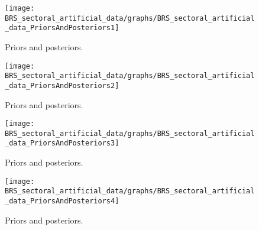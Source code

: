  
\begin{figure}[H]
\centering
\texttt{[image: BRS\_sectoral\_artificial\_data/graphs/BRS\_sectoral\_artificial\_data\_PriorsAndPosteriors1]}
\caption{Priors and posteriors.}\label{Fig:PriorsAndPosteriors:1}
\end{figure}
 
\begin{figure}[H]
\centering
\texttt{[image: BRS\_sectoral\_artificial\_data/graphs/BRS\_sectoral\_artificial\_data\_PriorsAndPosteriors2]}
\caption{Priors and posteriors.}\label{Fig:PriorsAndPosteriors:2}
\end{figure}
 
\begin{figure}[H]
\centering
\texttt{[image: BRS\_sectoral\_artificial\_data/graphs/BRS\_sectoral\_artificial\_data\_PriorsAndPosteriors3]}
\caption{Priors and posteriors.}\label{Fig:PriorsAndPosteriors:3}
\end{figure}
 
\begin{figure}[H]
\centering
\texttt{[image: BRS\_sectoral\_artificial\_data/graphs/BRS\_sectoral\_artificial\_data\_PriorsAndPosteriors4]}
\caption{Priors and posteriors.}\label{Fig:PriorsAndPosteriors:4}
\end{figure}
 
